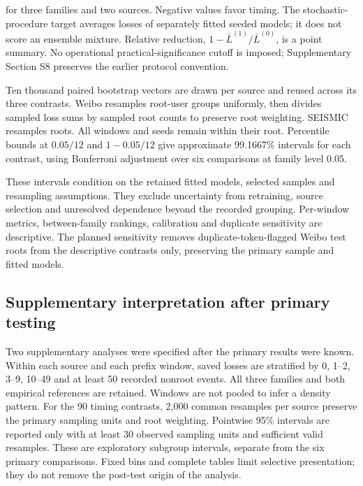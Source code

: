 for three families and two sources. Negative values favor timing. The stochastic-procedure target averages losses of separately fitted seeded models; it does not score an ensemble mixture. Relative reduction, \(1-\bar L^{(1)}/\bar L^{(0)}\), is a point summary. No operational practical-significance cutoff is imposed; Supplementary Section S8 preserves the earlier protocol convention.

Ten thousand paired bootstrap vectors are drawn per source and reused across its three contrasts. Weibo resamples root-user groups uniformly, then divides sampled loss sums by sampled root counts to preserve root weighting. SEISMIC resamples roots. All windows and seeds remain within their root. Percentile bounds at \(0.05/12\) and \(1-0.05/12\) give approximate 99.1667\% intervals for each contrast, using Bonferroni adjustment over six comparisons at family level 0.05.

These intervals condition on the retained fitted models, selected samples and resampling assumptions. They exclude uncertainty from retraining, source selection and unresolved dependence beyond the recorded grouping. Per-window metrics, between-family rankings, calibration and duplicate sensitivity are descriptive. The planned sensitivity removes duplicate-token-flagged Weibo test roots from the descriptive contrasts only, preserving the primary sample and fitted models.

\hypertarget{supplementary-interpretation-after-primary-testing}{%
\subsection{Supplementary interpretation after primary testing}}

Two supplementary analyses were specified after the primary results were known. Within each source and each prefix window, saved losses are stratified by 0, 1--2, 3--9, 10--49 and at least 50 recorded nonroot events. All three families and both empirical references are retained. Windows are not pooled to infer a density pattern. For the 90 timing contrasts, 2,000 common resamples per source preserve the primary sampling units and root weighting. Pointwise 95\% intervals are reported only with at least 30 observed sampling units and sufficient valid resamples. These are exploratory subgroup intervals, separate from the six primary comparisons. Fixed bins and complete tables limit selective presentation; they do not remove the post-test origin of the analysis.

